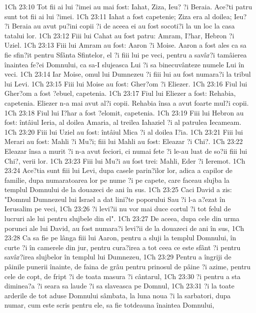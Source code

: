 1Ch 23:10  Tot fii ai lui ?imei au mai fost: Iahat, Ziza, Ieu? ?i Beraia. Ace?ti patru sunt tot fii ai lui ?imei.
1Ch 23:11  Iahat a fost capetenie; Ziza era al doilea; Ieu? ?i Beraia au avut pu?ini copii ?i de aceea ei au fost socoti?i la un loc la casa tatalui lor.
1Ch 23:12  Fiii lui Cahat au fost patru: Amram, I?har, Hebron ?i Uziel.
1Ch 23:13  Fiii lui Amram au fost: Aaron ?i Moise. Aaron a fost ales ca sa fie sfin?it pentru Sfânta Sfintelor, el ?i fiii lui pe veci, pentru a savâr?i tamâierea înaintea fe?ei Domnului, ca sa-I slujeasca Lui ?i sa binecuvânteze numele Lui în veci.
1Ch 23:14  Iar Moise, omul lui Dumnezeu ?i fiii lui au fost numara?i la tribul lui Levi.
1Ch 23:15  Fiii lui Moise au fost: Gher?om ?i Eliezer.
1Ch 23:16  Fiul lui Gher?om a fost ?ebuel, capetenia.
1Ch 23:17  Fiul lui Eliezer a fost: Rehabia, capetenia. Eliezer n-a mai avut al?i copii. Rehabia însa a avut foarte mul?i copii.
1Ch 23:18  Fiul lui I?har a fost ?elomit, capetenia.
1Ch 23:19  Fiii lui Hebron au fost: întâiul Ieria, al doilea Amaria, al treilea Iahaziel ?i al patrulea Iecameam.
1Ch 23:20  Fiii lui Uziel au fost: întâiul Mica ?i al doilea I?ia.
1Ch 23:21  Fiii lui Merari au fost: Mahli ?i Mu?i; fiii lui Mahli au fost: Eleazar ?i Chi?.
1Ch 23:22  Eleazar însa a murit ?i n-a avut feciori, ci numai fete ?i le-au luat de so?ii fiii lui Chi?, verii lor.
1Ch 23:23  Fiii lui Mu?i au fost trei: Mahli, Eder ?i Ieremot.
1Ch 23:24  Ace?tia sunt fiii lui Levi, dupa casele parin?ilor lor, adica a capilor de familie, dupa numaratoarea lor pe nume ?i pe capete, care faceau slujba la templul Domnului de la douazeci de ani în sus.
1Ch 23:25  Caci David a zis: "Domnul Dumnezeul lui Israel a dat lini?te poporului Sau ?i l-a a?ezat în Ierusalim pe veci,
1Ch 23:26  ?i levi?ii nu vor mai duce cortul ?i tot felul de lucruri ale lui pentru slujbele din el".
1Ch 23:27  De aceea, dupa cele din urma porunci ale lui David, au fost numara?i levi?ii de la douazeci de ani în sus,
1Ch 23:28  Ca sa fie pe lânga fiii lui Aaron, pentru a sluji la templul Domnului, în curte ?i în camerele din jur, pentru cura?irea a tot ceea ce este sfânt ?i pentru savâr?irea slujbelor în templul lui Dumnezeu,
1Ch 23:29  Pentru a îngriji de pâinile punerii înainte, de faina de grâu pentru prinosul de pâine ?i azime, pentru cele de copt, de fript ?i de toata masura ?i cântarul,
1Ch 23:30  ?i pentru a sta diminea?a ?i seara sa laude ?i sa slaveasca pe Domnul,
1Ch 23:31  ?i la toate arderile de tot aduse Domnului sâmbata, la luna noua ?i la sarbatori, dupa numar, cum este scris pentru ele, sa fie totdeauna înaintea Domnului,

